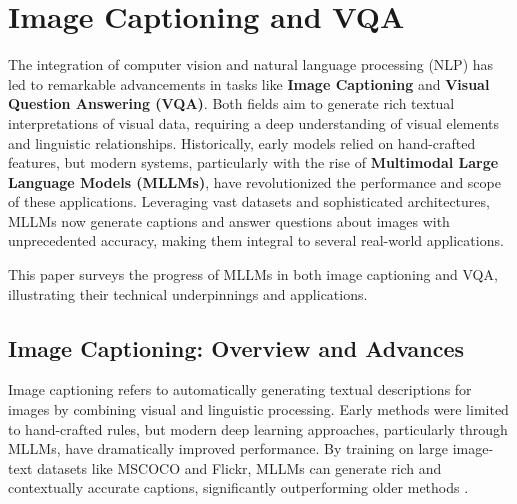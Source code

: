 \documentclass{article}
\begin{document}
\section{Image Captioning and VQA}
The integration of computer vision and natural language processing (NLP) has led to remarkable advancements in tasks like \textbf{Image Captioning} and \textbf{Visual Question Answering (VQA)}. Both fields aim to generate rich textual interpretations of visual data, requiring a deep understanding of visual elements and linguistic relationships. Historically, early models relied on hand-crafted features, but modern systems, particularly with the rise of \textbf{Multimodal Large Language Models (MLLMs)}, have revolutionized the performance and scope of these applications. Leveraging vast datasets and sophisticated architectures, MLLMs now generate captions and answer questions about images with unprecedented accuracy, making them integral to several real-world applications.

This paper surveys the progress of MLLMs in both image captioning and VQA, illustrating their technical underpinnings and applications.

\subsection{Image Captioning: Overview and Advances}
Image captioning refers to automatically generating textual descriptions for images by combining visual and linguistic processing. Early methods were limited to hand-crafted rules, but modern deep learning approaches, particularly through MLLMs, have dramatically improved performance. By training on large image-text datasets like MSCOCO and Flickr, MLLMs can generate rich and contextually accurate captions, significantly outperforming older methods \cite{icmeta2020m2transformer, icmeta2019oscar, icmeta2020densecap}.
\end{document}
